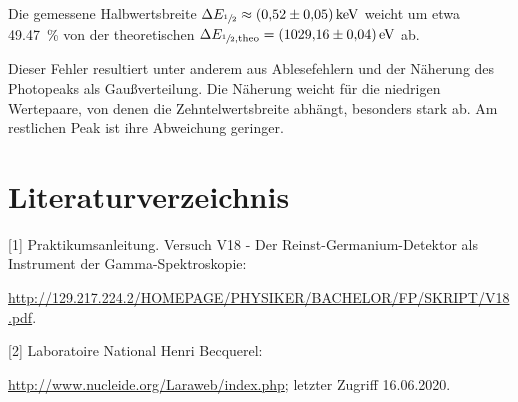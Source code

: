 

Die gemessene Halbwertsbreite $\Delta E_{\sfrac{1}{2}} \approx \SI{0.52 +- 0.05}{\kilo\eV}$ weicht um etwa
\SI{49.47}{\percent} von der theoretischen $\Delta E_{\sfrac{1}{2}, \text{theo}} = \SI{1029.16 +- 0.04}{\eV}$ ab.

Dieser Fehler resultiert unter anderem aus Ablesefehlern und der Näherung des Photopeaks als Gaußverteilung.
Die Näherung weicht für die niedrigen Wertepaare, von denen die Zehntelwertsbreite abhängt, besonders stark ab.
Am restlichen Peak ist ihre Abweichung geringer. \\


\section{Literaturverzeichnis}
\label{sec:Diskussion}

[1] Praktikumsanleitung. Versuch V18 - Der Reinst-Germanium-Detektor als Instrument
der Gamma-Spektroskopie:

\url{http://129.217.224.2/HOMEPAGE/PHYSIKER/BACHELOR/FP/SKRIPT/V18.pdf}.

[2] Laboratoire National Henri Becquerel:

\url{http://www.nucleide.org/Laraweb/index.php}; letzter Zugriff 16.06.2020.
